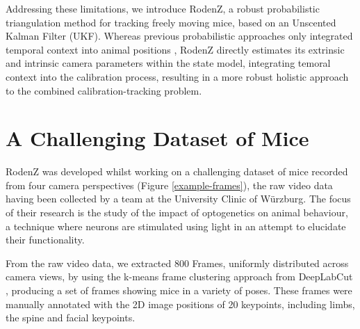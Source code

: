 \documentclass[sigconf, nonacm]{acmart}
\begin{document}
Addressing these limitations, we introduce RodenZ, a robust probabilistic triangulation method for tracking freely moving mice, based on an Unscented Kalman Filter (UKF). Whereas previous probabilistic approaches only integrated temporal context into animal positions \cite{Joska2021}, RodenZ directly estimates its extrinsic and intrinsic camera parameters within the state model, integrating temoral context into the calibration process, resulting in a more robust holistic approach to the combined calibration-tracking problem.

\section{A Challenging Dataset of Mice}
\label{sec:dataset}
RodenZ was developed whilst working on a challenging dataset of mice recorded from four camera perspectives (Figure \ref{example-frames}), the raw video data having been collected by a team at the University Clinic of Würzburg. The focus of their research is the study of the impact of optogenetics on animal behaviour, a technique where neurons are stimulated using light in an attempt to elucidate their functionality\cite{Hyeon2025, Marton2016}.\par
From the raw video data, we extracted 800 Frames, uniformly distributed across camera views, by using the k-means frame clustering approach from DeepLabCut \cite{Nath2019}, producing a set of frames showing mice in a variety of poses. These frames were manually annotated with the 2D image positions of 20 keypoints, including limbs, the spine and facial keypoints.\par
\end{document}
